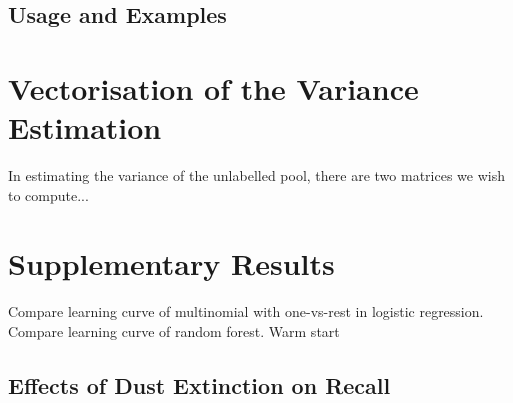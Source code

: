 \section{Usage and Examples}
\label{sec:usage}


\chapter{Vectorisation of the Variance Estimation}
\label{cha:vectorise}

In estimating the variance of the unlabelled pool, there are two matrices we wish to compute...


\chapter{Supplementary Results}

Compare learning curve of multinomial with one-vs-rest in logistic regression.
Compare learning curve of random forest. Warm start


\section{Effects of Dust Extinction on Recall}


